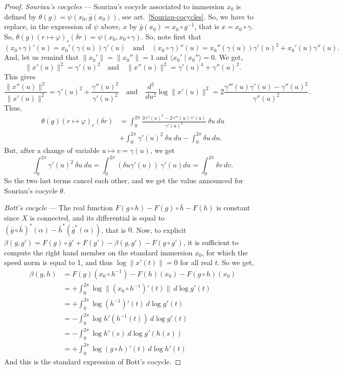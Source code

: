 \documentclass[10pt,reqno,twoside]{amsart}
\theoremstyle{plain}
\theoremstyle{definition}
\begin{document}
\begin{proof}
    \emph{Souriau's cocycles} --- Souriau's cocycle associated to immersion $x_0$ is defined by $\theta(g) = \psi(x_0,\bar{g}(x_0))$,
    see art.~\ref{Souriau-cocycles}.
    So,
    we have to replace,
    in the expression of $\psi$ above,
    $x$ by $\bar{g} (x_0) = x_0 \circ g^{-1}$,
    that is $x= x_0 \circ \gamma$.
    So,
    $\theta(g)(r \mapsto \varphi)_r(\delta r) = \psi(x_0,x_0 \circ \gamma)$.
    So,
    note first that
    \[
    (x_0 \circ \gamma)'(u) = x_0'(\gamma(u)) \gamma'(u) \quad\text{and}\quad (x_0 \circ \gamma)''(u) = x_0''(\gamma(u)) \gamma'(u)^2 + x_0'(u) \gamma''(u).
    \]
    And,
    let us remind that $\lVert x_0'\rVert = \lVert x_0''\rVert = 1$ and $\langle x_0' \mid x_0'' \rangle = 0$.
    We get,
    \[
    \lVert x'(u)\rVert^2 = \gamma'(u)^2 \quad\text{and}\quad \lVert x''(u)\rVert^2 = \gamma'(u)^4 + \gamma''(u)^2.
    \]
    This gives
    \[
    \frac{\lVert x''(u)\rVert^2}{\lVert x'(u)\rVert^2} = \gamma'(u)^2 + \frac{\gamma''(u)^2}{\gamma'(u)^2} \quad\text{and}\quad \frac{d^2}{du^2}\log\lVert x'(u)\rVert^2 = 2\frac{\gamma'''(u) \gamma'(u) - \gamma''(u)^2}{\gamma''(u)^2}.
    \]
    Thus,
    \begin{align*}
      \theta(g)(r \mapsto \varphi)_r(\delta r) &= \int_0^{2\pi} \frac{ 3 \gamma''(u)^2 - 2 \gamma'''(u) \gamma'(u)}{\gamma'(u)^2} \ \delta u \ du \\
      &+ \int_0^{2\pi} \gamma'(u)^2 \ \delta u \ du - \int_0^{2\pi} \delta u \ du.
    \end{align*}
    But,
    after a change of variable $u \mapsto v = \gamma(u)$,
    we get
    \[
    \int_0^{2\pi} \gamma'(u)^2 \ \delta u \ du = \int_0^{2\pi} (\delta u \gamma'(u)) \ \gamma'(u) du = \int_0^{2\pi} \delta v \ dv.
    \]
    So the two last terms cancel each other,
    and we get the value announced for Souriau's cocycle $\theta$.
    
    \emph{Bott's cocycle} --- The real function $F(g \circ h) - F(g) \circ \bar{h} - F(h)$ is constant since $X$ is connected,
    and its differential is equal to $(\bar{g} \circ \bar{h})^*(\alpha) - \bar{h}^*(\bar{g}^*(\alpha))$,
    that is $0$.
    Now,
    to explicit $\beta(g,g') = F(g)\circ \bar{g}' + F(g') - \beta(g,g') - F(g \circ g')$,
    it is sufficient to compute the right hand member on the standard immersion $x_0$,
    for which the speed norm is equal to 1,
    and thus $\log \lVert x'(t)\rVert = 0$ for all real $t$.
    So we get,
    \begin{align*}
      \beta(g,h) &= {F}(g)(x_0 \circ h^{-1}) - F(h)(x_0) - F(g \circ h)(x_0) \\
      &= + \int_0^{2\pi} \log\lVert (x_0 \circ h^{-1})'(t)\rVert \ d \log g'(t) \\
      &= + \int_0^{2\pi} \log (h^{-1})'(t) \ d\log g'(t) \\
      &= - \int_0^{2\pi} \log h'(h^{-1}(t)) \ d\log g'(t) \\
      &= - \int_0^{2\pi} \log h'(s) \ d\log g'(h(s)) \\
      &= + \int_0^{2\pi} \log(g \circ h)'(t) \ d\log h'(t)
    \end{align*}
    And this is the standard expression of Bott's cocycle.
  \end{proof}
  
\end{document}
